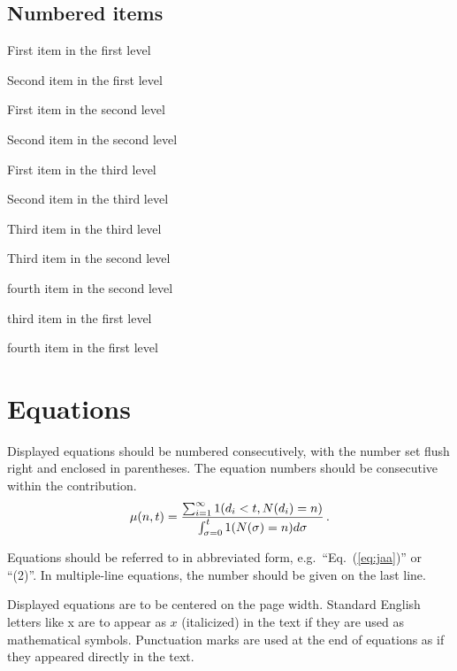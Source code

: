 \documentclass{ws-jmmb}
\begin{document}
\subsection*{Numbered items}

\begin{arabiclist}
\item First item in the first level
\item Second item in the first level
\begin{alphlist}[(a)]
\item First item in the second level 
\item Second item in the second level
\begin{romanlist}[iii.]
\item First item in the third level 
\item Second item in the third level
\item Third item in the third level
\end{romanlist}
\item Third item in the second level
\item fourth item in the second level
\end{alphlist}
\item third item in the first level
\item fourth item in the first level
\end{arabiclist}

\section{Equations}

Displayed equations should be numbered consecutively,
with the number set flush right and enclosed in parentheses. The
equation numbers should be consecutive within the contribution.
\begin{equation}
\mu(n, t) = {\sum^\infty_{i=1} 1(d_i < t, N(d_i) = n) \over
\int^t_{\sigma=0} 1(N(\sigma) = n)d\sigma}\,.
\label{eq:jaa}
\end{equation}

Equations should be referred to in abbreviated form,
e.g.~``Eq.~(\ref{eq:jaa})'' or ``(2)''. In multiple-line
equations, the number should be given on the last line.

Displayed equations are to be centered on the page width.
Standard English letters like x are to appear as $x$
(italicized) in the text if they are used as mathematical
symbols. Punctuation marks are used at the end of equations as
if they appeared directly in the text.
\end{document}
